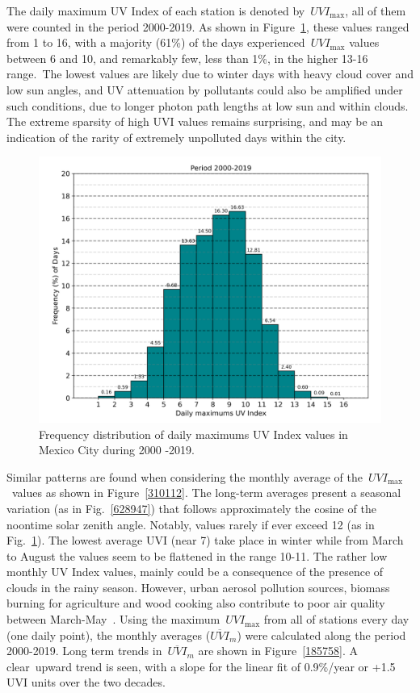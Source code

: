 \documentclass[journal=jacsat,manuscript=article]{achemso}
\begin{document}
The daily maximum UV Index of each station is denoted
by~\(UVI_{\max}\), all of them were counted in the period 2000-2019.
As shown in Figure~{\ref{461017}}, these values ranged
from 1 to 16, with a majority (61\%) of the days
experienced~\(UVI_{\max}\) values between 6 and 10, and remarkably
few, less than 1\%, in the higher 13-16 range.~The lowest values are
likely due to winter days with heavy cloud cover and low sun angles, and
UV attenuation by pollutants could also be amplified under such
conditions, due to longer photon path lengths at low sun and within
clouds. The extreme sparsity of high UVI values remains surprising, and
may be an indication of the rarity of extremely unpolluted days within
the city.

\begin{figure}[H]
  \begin{center}
    \includegraphics[width=0.49\columnwidth]{figures/Histogram}
    \caption{{Frequency distribution of daily maximums UV Index values in Mexico City
    during 2000 -2019.
    {\label{461017}}%
    }}
  \end{center}
\end{figure}

Similar patterns are found when considering the monthly average of
the~\(UVI_{\max}\)~values as shown in
Figure~{\ref{310112}}. The long-term averages present a
seasonal variation (as in Fig.~{\ref{628947}}) that
follows approximately the cosine of the noontime solar zenith angle.
Notably, values rarely if ever exceed 12 (as in
Fig.~{\ref{461017}}). The lowest average UVI (near 7)
take place in winter while from March to August the values seem to be
flattened in the range 10-11. The rather low monthly UV Index values,
mainly could be a consequence of the presence of clouds in the rainy
season. However, urban aerosol pollution sources, biomass burning for
agriculture and wood cooking also contribute to poor air quality between
March-May~\citep{Retama_2015}. Using the
maximum~\(UVI_{\max}\) from all of stations every day (one daily
point), the monthly averages (\(\overline{UVI}_m\)) were calculated along
the period 2000-2019. Long term trends in~\(\overline{UVI}_m\) are shown
in Figure~{\ref{185758}}. A clear~upward trend is seen,
with a slope for the linear fit of 0.9\%/year or +1.5 UVI units over the
two decades.
\end{document}
